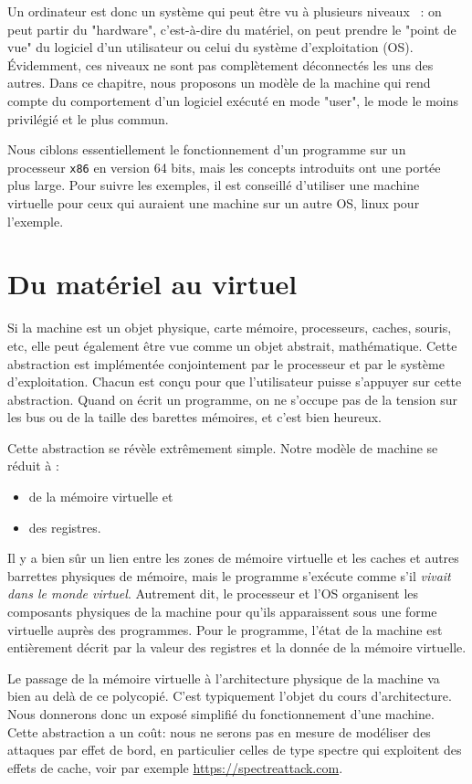\documentclass{book}
\newcommand{\xquatre}{{\tt x86}\xspace}
\begin{document}
Un ordinateur est donc un système qui peut être vu à plusieurs niveaux~ : on peut partir du "hardware", c'est-à-dire du matériel, on peut prendre le "point de vue" du logiciel d'un utilisateur ou celui du système d'exploitation (OS). \'Evidemment, ces niveaux ne sont pas complètement déconnectés les uns des autres. Dans ce chapitre, nous proposons un modèle de la machine qui rend compte du comportement d'un logiciel exécuté en mode "user", le mode le moins privilégié et le plus commun.

Nous ciblons essentiellement le fonctionnement d'un programme sur un processeur \xquatre en version 64 bits, mais les concepts introduits ont une portée plus large. Pour suivre les exemples, il est conseillé d'utiliser une machine virtuelle pour ceux qui auraient une machine sur un autre OS, {\sc linux} pour l'exemple. 


\section{Du matériel au virtuel}

Si la machine est un objet physique, carte mémoire, processeurs, caches, souris, etc, elle peut également être vue comme un objet abstrait, mathématique. Cette abstraction est implémentée conjointement par le processeur et par le système d'exploi\-tation. Chacun est conçu pour que l'utilisateur puisse s'appuyer sur cette abstraction. Quand on écrit un programme, on ne s'occupe pas de la tension sur les bus ou de la taille des barettes mémoires, et c'est bien heureux.

Cette abstraction se révèle extrêmement simple. Notre modèle de machine se réduit à :
\begin{itemize}
	\item de la mémoire virtuelle et
	\item  des registres. 
\end{itemize}

Il y a bien sûr un lien entre les zones de mémoire virtuelle et les caches et autres barrettes physiques de mémoire, mais le programme s'exécute comme s'il \emph{vivait dans le monde virtuel}. Autrement dit, le processeur et l'OS organisent les composants physiques de la machine pour qu'ils apparaissent sous une forme virtuelle auprès des programmes. Pour le programme, l'état de la machine est entièrement décrit par la valeur des registres et la donnée de la mémoire virtuelle. 

Le passage de la mémoire virtuelle à l'architecture physique de la machine va bien au delà de ce polycopié. C'est typiquement l'objet du cours d'architecture. Nous donnerons donc un exposé simplifié du fonctionnement d'une machine. Cette abstraction a un coût: nous ne serons pas en mesure de modéliser des attaques par effet de bord, en particulier celles de type {\sc spectre} qui exploitent des effets de cache, voir par exemple \url{https://spectreattack.com}. %
\end{document}
